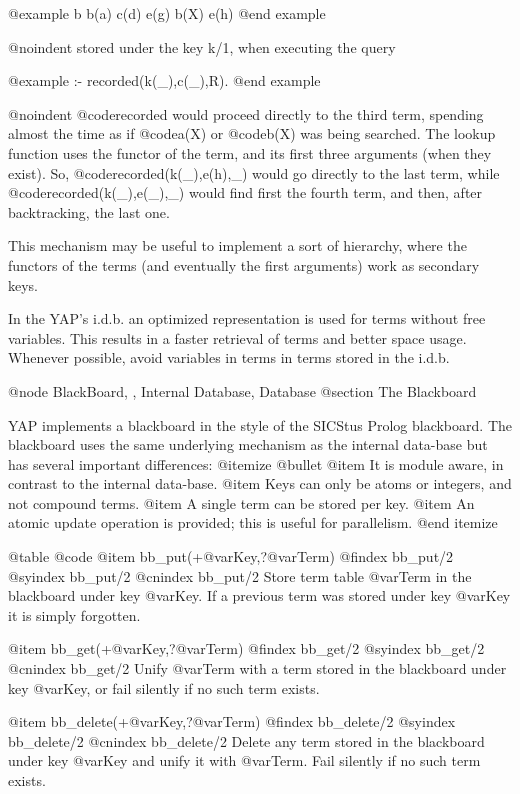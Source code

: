 {{{{{{@example
b
b(a)
c(d)
e(g)
b(X)
e(h)
@end example

@noindent
stored under the key k/1, when executing the query 

@example
:- recorded(k(_),c(_),R).
@end example

@noindent
@code{recorded} would proceed directly to the third term, spending almost the 
time as if @code{a(X)} or @code{b(X)} was being searched.
 The lookup function uses the functor of the term, and its first three
arguments (when they exist). So, @code{recorded(k(_),e(h),_)} would go
directly to the last term, while @code{recorded(k(_),e(_),_)} would find
first the fourth term, and then, after backtracking, the last one.

 This mechanism may be useful to implement a sort of hierarchy, where 
the functors of the terms (and eventually the first arguments) work as 
secondary keys.

 In the YAP's i.d.b. an optimized representation is used for 
terms without free variables. This results in a faster retrieval of terms 
and better space usage. Whenever possible, avoid variables in terms in terms stored in the  i.d.b.


@node BlackBoard, , Internal Database, Database
@section The Blackboard

YAP implements a blackboard in the style of the SICStus Prolog
blackboard. The blackboard uses the same underlying mechanism as the
internal data-base but has several important differences:
@itemize @bullet
@item It is module aware, in contrast to the internal data-base.
@item Keys can only be atoms or integers, and not compound terms.
@item A single term can be stored per key.
@item An atomic update operation is provided; this is useful for
parallelism.
@end itemize


@table @code
@item bb_put(+@var{Key},?@var{Term})
@findex bb_put/2
@syindex bb_put/2
@cnindex bb_put/2
Store term table @var{Term} in the blackboard under key @var{Key}. If a
previous term was stored under key @var{Key} it is simply forgotten.

@item bb_get(+@var{Key},?@var{Term})
@findex bb_get/2
@syindex bb_get/2
@cnindex bb_get/2
Unify @var{Term} with a term stored in the blackboard under key
@var{Key}, or fail silently if no such term exists.

@item bb_delete(+@var{Key},?@var{Term})
@findex bb_delete/2
@syindex bb_delete/2
@cnindex bb_delete/2
Delete any term stored in the blackboard under key @var{Key} and unify
it with @var{Term}. Fail silently if no such term exists.

}}}}}}
